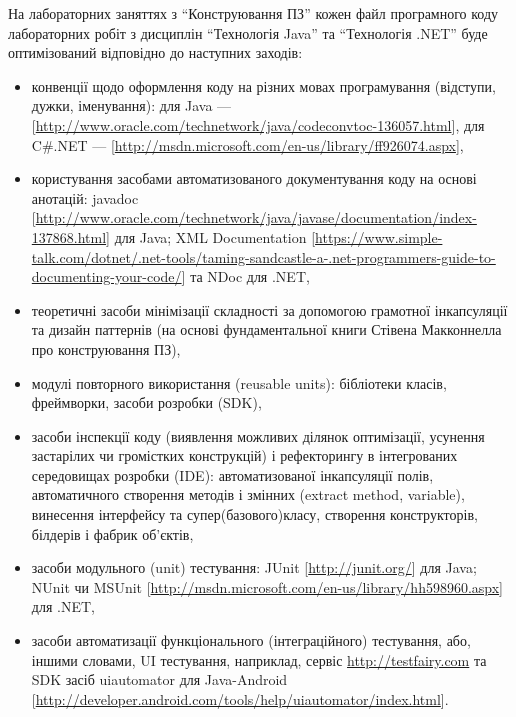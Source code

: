 На лабораторних заняттях з ``Конструювання ПЗ'' кожен файл програмного коду лабораторних робіт з дисциплін ``Технологія Java'' та ``Технологія .NET'' буде оптимізований відповідно до наступних заходів:
\begin{itemize} 
\item конвенції щодо оформлення коду на різних мовах програмування (відступи, дужки, іменування): для Java --- [\url{http://www.oracle.com/technetwork/java/codeconvtoc-136057.html}], 
для C\#.NET --- [\url{http://msdn.microsoft.com/en-us/library/ff926074.aspx}],
\item користування засобами автоматизованого документування коду на основі анотацій: javadoc [\url{http://www.oracle.com/technetwork/java/javase/documentation/index-137868.html}] для Java; XML Documentation [\url{https://www.simple-talk.com/dotnet/.net-tools/taming-sandcastle-a-.net-programmers-guide-to-documenting-your-code/}] та NDoc для .NET, 
\item теоретичні засоби мінімізації складності за допомогою грамотної інкапсуляції та дизайн паттернів (на основі фундаментальної книги Стівена Макконнелла про конструювання ПЗ),
\item модулі повторного використання (reusable units): бібліотеки класів, фреймворки, засоби розробки (SDK),
\item засоби інспекції коду (виявлення можливих ділянок оптимізації, усунення застарілих чи громістких конструкцій) і рефекторингу в інтегрованих середовищах розробки (IDE): автоматизованої інкапсуляції полів, автоматичного створення методів і змінних (extract method, variable), винесення інтерфейсу та супер(базового)класу, створення конструкторів, білдерів і фабрик об'єктів,
\item засоби модульного (unit) тестування: JUnit [\url{http://junit.org/}] для Java; NUnit чи MSUnit [\url{http://msdn.microsoft.com/en-us/library/hh598960.aspx}] для .NET,
\item засоби автоматизації функціонального (інтеграційного) тестування, або, іншими словами, UI тестування, наприклад, сервіс \url{http://testfairy.com} та SDK засіб uiautomator для Java-Android [\url{http://developer.android.com/tools/help/uiautomator/index.html}].
\end{itemize}
